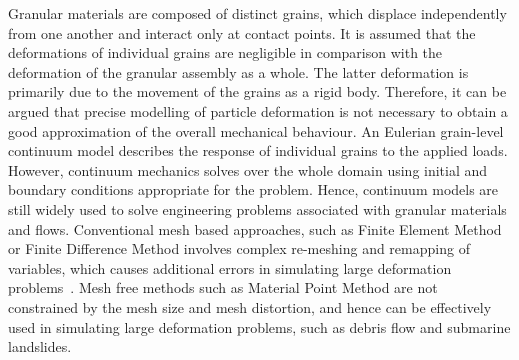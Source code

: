 Granular materials are composed of distinct grains, which displace 
independently from one another and interact only at contact points. It is 
assumed that the deformations of individual grains are negligible in comparison 
with the deformation of the granular assembly as a whole. The latter 
deformation is primarily due to the movement of the grains as a rigid body. 
Therefore, it can be argued that precise modelling of particle deformation is 
not necessary to obtain a good approximation of the overall mechanical 
behaviour. An Eulerian grain-level continuum model describes the response of 
individual grains to the applied loads. However, continuum mechanics solves 
over the whole domain using initial and boundary conditions appropriate for the 
problem. Hence, continuum models are still widely used to solve engineering 
problems associated with granular materials and flows. Conventional mesh based 
approaches, such as Finite Element Method or Finite Difference Method involves 
complex re-meshing and remapping of variables, which causes additional errors 
in simulating large deformation problems~\citep{Li2002}. Mesh free methods such 
as Material Point Method are not constrained by the mesh size and mesh 
distortion, and hence can be effectively used in simulating large deformation 
problems, such as debris flow and submarine landslides.


